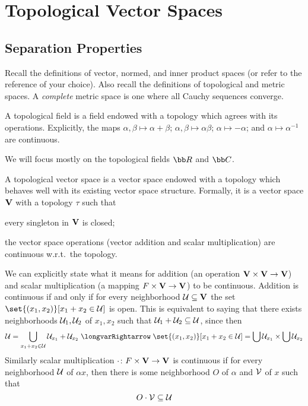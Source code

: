 \section{Topological Vector Spaces}

\subsection{Separation Properties}

Recall the definitions of vector, normed, and inner product spaces (or refer to the reference of your choice).
Also recall the definitions of topological and metric spaces.
A {\it complete\/} metric space is one where all Cauchy sequences converge.

\bdefn

    A {\emphcolor topological field} is a field endowed with a topology which agrees with its operations.
    Explicitly, the maps $\alpha,\beta\mapsto\alpha+\beta$; $\alpha,\beta\mapsto\alpha\beta$; $\alpha\mapsto-\alpha$; and $\alpha\mapsto\alpha^{-1}$ are continuous.

\edefn

We will focus mostly on the topological fields $\bb R$ and $\bb C$.

\bdefn

    A {\emphcolor topological vector space} is a vector space endowed with a topology which behaves well with its existing vector space structure.
    Formally, it is a vector space ${\bf V}$ with a topology $\tau$ such that
    \benum
        \item every singleton in ${\bf V}$ is closed;
        \item the vector space operations (vector addition and scalar multiplication) are continuous w.r.t.\ the topology.
    \eenum

\edefn

We can explicitly state what it means for addition (an operation ${\bf V}\times {\bf V}\to {\bf V}$) and scalar multiplication (a mapping $F\times {\bf V}\to {\bf V}$) to be continuous.
Addition is continuous if and only if for every neighborhood ${\cal U}\subseteq {\bf V}$ the set $\set{(x_1,x_2)}[x_1+x_2\in\U]$ is open.
This is equivalent to saying that there exists neighborhoods ${\cal U}_1,{\cal U}_2$ of $x_1,x_2$ such that ${\cal U}_1+{\cal U}_2\subseteq{\cal U}$, since then
$$ \U = \bigcup_{x_1+x_2\in\U}\U_{x_1}+\U_{x_2} \implies \set{(x_1,x_2)}[x_1+x_2\in\U] = \bigcup\U_{x_1}\times\bigcup\U_{x_2} $$
Similarly scalar multiplication $\cdot\colon F\times {\bf V}\to {\bf V}$ is continuous if for every neighborhood ${\cal U}$ of $\alpha x$, then there is some neighborhood $O$ of $\alpha$ and ${\cal V}$ of $x$ such that
$$ O\cdot{\cal V}\subseteq{\cal U} $$

